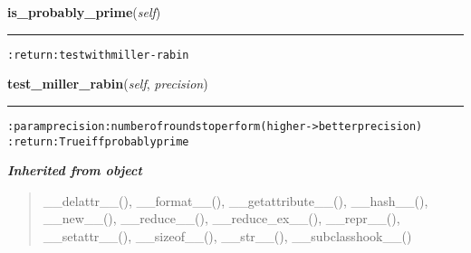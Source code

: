 \hspace{.8\funcindent}\begin{boxedminipage}{\funcwidth}

    \raggedright \textbf{is\_probably\_prime}(\textit{self})

    \vspace{-1.5ex}

    \rule{\textwidth}{0.5\fboxrule}
\setlength{\parskip}{2ex}
\begin{alltt}

:return: test with miller-rabin
\end{alltt}

\setlength{\parskip}{1ex}
    \end{boxedminipage}

    \label{hal:maths:maths:Integer:test_miller_rabin}

    \vspace{0.5ex}

\hspace{.8\funcindent}\begin{boxedminipage}{\funcwidth}

    \raggedright \textbf{test\_miller\_rabin}(\textit{self}, \textit{precision})

    \vspace{-1.5ex}

    \rule{\textwidth}{0.5\fboxrule}
\setlength{\parskip}{2ex}
\begin{alltt}

:param precision: number of rounds to perform (higher -{\textgreater} better precision)
:return: True iff probably prime
\end{alltt}

\setlength{\parskip}{1ex}
    \end{boxedminipage}


\large{\textbf{\textit{Inherited from object}}}

\begin{quote}
\_\_delattr\_\_(), \_\_format\_\_(), \_\_getattribute\_\_(), \_\_hash\_\_(), \_\_new\_\_(), \_\_reduce\_\_(), \_\_reduce\_ex\_\_(), \_\_repr\_\_(), \_\_setattr\_\_(), \_\_sizeof\_\_(), \_\_str\_\_(), \_\_subclasshook\_\_()
\end{quote}


